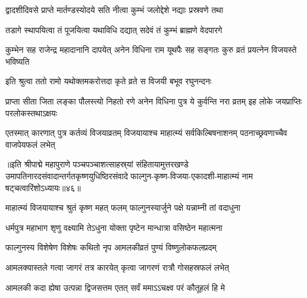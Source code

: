 \twolineshloka
{द्वादशीदिवसे प्राप्ते मार्तण्डस्योदये सति}
{नीत्वा कुम्भं जलोद्देशे नद्याः प्रस्रवणे तथा}%

\twolineshloka
{तडागे स्थापयित्वा तं पूजयित्वा यथाविधि}
{दद्यात् सदेवं तं कुम्भं ब्राह्मणे वेदपारगे}%

\threelineshloka
{कुम्भेन सह राजेन्द्र महादानानि दापयेत्}
{अनेन विधिना राम यूथपैः सह सङ्गतः}
{कुरु व्रतं प्रयत्नेन विजयस्ते भविष्यति}%


\twolineshloka
{इति श्रुत्वा ततो रामो यथोक्तमकरोत्तदा}
{कृते व्रते स विजयी बभूव रघुनन्दनः}%

\threelineshloka
{प्राप्ता सीता जिता लङ्का पौलस्त्यो निहतो रणे}
{अनेन विधिना पुत्र ये कुर्वन्ति नरा व्रतम्}
{इह लोके जयप्राप्तिः परलोकस्तथाऽक्षयः} %


\threelineshloka
{एतस्मात् कारणात् पुत्र कर्तव्यं विजयाव्रतम्}
{विजयायाश्च माहात्म्यं सर्वकिल्बिषनाशनम्}
{पठनाच्छ्रवणाच्चैव वाजपेयफलं लभेत्}%

॥इति श्रीपाद्मे महापुराणे पञ्चपञ्चाशत्साहस्र्यां संहितायामुत्तरखण्डे उमापतिनारदसंवादान्तर्गतकृष्णयुधिष्ठिरसंवादे फाल्गुन-कृष्ण-विजया-एकादशी-माहात्म्यं नाम षट्चत्वारिंशोऽध्यायः॥४६॥

\genMangalaShloka

\hyperref[sec:ekadashi_mahatmyam_padma_puranam]{\closesub}
\clearpage

\label{sec:padma-phalguna-shuklamalaki}

\ganapatyadiDhyanam
\padmaPuranam



\twolineshloka
{माहात्म्यं विजयायाश्च श्रुतं कृष्ण महत् फलम्}
{फाल्गुनस्यार्जुने पक्षे यन्नाम्नी तां वदाधुना}%


\twolineshloka
{धर्मपुत्र महाभाग शृणु वक्ष्यामि तेऽधुना}
{योक्ता पृष्टेन मान्धात्रा वसिष्ठेन महात्मना}%

\twolineshloka
{फाल्गुनस्य विशेषेण विशेषः कथितो नृप}
{आमलकीव्रतं पुण्यं विष्णुलोकफलप्रदम्}%

\twolineshloka
{आमलक्यास्तले गत्वा जागरं तत्र कारयेत्}
{कृत्वा जागरणं रात्रौ गोसहस्रफलं लभेत्}%


\twolineshloka
{आमलकी कदा ह्येषा उत्पन्ना द्विजसत्तम}
{एतत् सर्वं ममाऽऽचक्ष्व परं कौतूहलं हि मे}%

